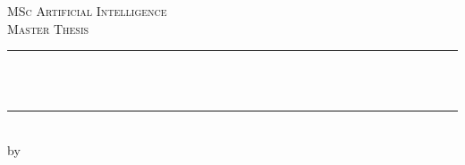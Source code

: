 \documentclass[12pt]{report}
\newcommand{\red}[1]{{\color{red}{#1}}}
\begin{document}
    \begin{titlepage}


        \newcommand{\HRule}{\rule{\linewidth}{0.5mm}} %

        \center %






        \textsc{\Large MSc Artificial Intelligence}\\[0.2cm]

        \textsc{\Large Master Thesis}\\[0.5cm]







        \HRule \\[0.4cm]

        { \huge \bfseries \red{Your Title Here}}\\[0.4cm] %

        \HRule \\[0.5cm]







        by\\[0.2cm]

        \textsc{\Large \red{Your Name}}\\[0.2cm] %

        \red{student number}\\[1cm]





\end{titlepage}
\end{document}
